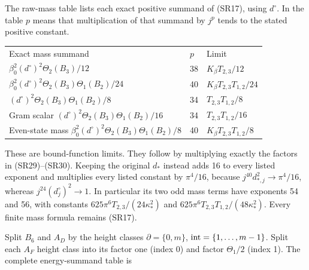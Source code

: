 \documentclass[11pt]{article}
\begin{document}
The raw-mass table lists each exact positive summand of (SR17), using \(d^\circ\). In the table \(p\) means that multiplication of that summand by \(j^p\) tends to the stated positive constant.

\begingroup\small\setlength{\tabcolsep}{3pt}\begin{longtable}{@{}p{}p{}p{}@{}}\toprule
Exact mass summand & \(p\) & Limit\\
\(\beta_0^2(d^\circ)^2\Theta_2(B_3)/12\) & 38 & \(K_\beta T_{2,3}/12\)\\
\(\beta_0^2(d^\circ)^2\Theta_2(B_3)\Theta_1(B_2)/24\) & 40 & \(K_\beta T_{2,3}T_{1,2}/24\)\\
\((d^\circ)^2\Theta_2(B_3)\Theta_1(B_2)/8\) & 34 & \(T_{2,3}T_{1,2}/8\)\\
Gram scalar \((d^\circ)^2\Theta_2(B_3)\Theta_1(B_2)/16\) & 34 & \(T_{2,3}T_{1,2}/16\)\\
Even-state mass \(\beta_0^2(d^\circ)^2\Theta_2(B_3)\Theta_1(B_2)/8\) & 40 & \(K_\beta T_{2,3}T_{1,2}/8\)\\
\bottomrule\end{longtable}\endgroup

These are bound-function limits. They follow by multiplying exactly the factors in (SR29)–(SR30). Keeping the original \(d_*\) instead adds 16 to every listed exponent and multiplies every listed constant by \(\pi^4/16\), because \(j^{40}d_{*,j}^2\to\pi^4/16\), whereas \(j^{24}(d_j^\circ)^2\to1\). In particular its two odd mass terms have exponents 54 and 56, with constants \(625\pi^6T_{2,3}/(24\kappa_*^2)\) and \(625\pi^6T_{2,3}T_{1,2}/(48\kappa_*^2)\). Every finite mass formula remains (SR17).

Split \(B_6\) and \(A_D\) by the height classes \(\partial=\{0,m\}\), \({\rm int}=\{1,\ldots,m-1\}\). Split each \(A_F\) height class into its factor one (index 0) and factor \(\Theta_1/2\) (index 1). The complete energy-summand table is
\end{document}
